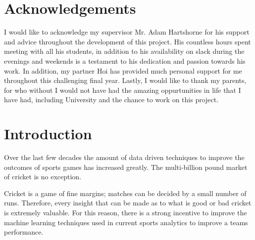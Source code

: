 \documentclass[12pt,a4paper]{report}
\theoremstyle{definition}
\begin{document}
\tableofcontents
\newpage

\listoffigures
\newpage

\listoftables
\newpage

\listofalgorithms
\newpage

\chapter*{Acknowledgements}

I would like to acknowledge my supervisor Mr. Adam Hartshorne for his support and advice throughout the development of this project.  
His countless hours spent meeting with all his students, in addition to his availability on slack during the evenings and weekends is a testament to his dedication and passion towards his work.
In addition, my partner Hoi has provided much personal support for me throughout this challenging final year.
Lastly, I would like to thank my parents, for who without I would not have had the amazing oppurtunities in life that I have had, including University and the chance to work on this project.

\newpage
\setcounter{page}{1}

\chapter{Introduction} \label{chap:Intro}

Over the last few decades the amount of data driven techniques to improve the outcomes of sports games has increased greatly. 
The multi-billion pound market of cricket is no exception. 

Cricket is a game of fine margins; matches can be decided by a small number of runs.
Therefore, every insight that can be made as to what is good or bad cricket is extremely valuable.
For this reason, there is a strong incentive to improve the machine learning techniques used in current sports analytics to improve a teams performance.
\end{document}
